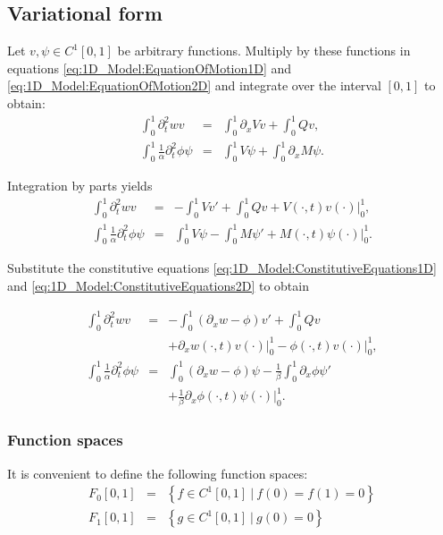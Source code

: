 \documentclass[../../main.tex]{subfiles}
\begin{document}
    \subsection{Variational form}\label{ssec:1D_Model:VariationalForm}
    Let $v, \psi \in C^1[0,1]$ be arbitrary functions. Multiply by these functions in equations \eqref{eq:1D_Model:EquationOfMotion1D} and \eqref{eq:1D_Model:EquationOfMotion2D} and integrate over the interval $[0,1]$ to obtain:
    \begin{eqnarray*}
        \int_{0}^{1} \partial_{t}^{2} w v &=& \int_{0}^{1}\partial_{x}V v + \int_{0}^{1} Q v ,\\
        \int_{0}^{1}\frac{1}{\alpha} \partial_{t}^{2} \phi \psi  &=& \int_{0}^{1}V \psi  + \int_{0}^{1}\partial_{x}M \psi.
    \end{eqnarray*}

    Integration by parts yields
    \begin{eqnarray*}
        \int_{0}^{1} \partial_{t}^{2} w v &=&  - \int_{0}^{1}V v' + \int_{0}^{1} Q v + V(\cdot,t) v(\cdot) |_0^1,\\
        \int_{0}^{1}\frac{1}{\alpha} \partial_{t}^{2} \phi \psi  &=& \int_{0}^{1}V \psi - \int_{0}^{1}M \psi' + M(\cdot,t) \psi(\cdot) |_0^1.
    \end{eqnarray*}

    Substitute the constitutive equations \eqref{eq:1D_Model:ConstitutiveEquations1D} and \eqref{eq:1D_Model:ConstitutiveEquations2D} to obtain

    \begin{eqnarray}
        \int_{0}^{1} \partial_{t}^{2} w v  &=& -\int_{0}^{1}(\partial_x w-\phi) v' + \int_{0}^{1} Q v \nonumber\\
        & & + \left. \partial_x w(\cdot,t) v(\cdot) \right |_0^1 -\left. \phi(\cdot,t) v(\cdot) \right |_0^1, \label{TGT_13}\\
        \int_{0}^{1}\frac{1}{\alpha} \partial_{t}^{2} \phi \psi  &=&  \int_{0}^{1} (\partial_x w - \phi) \psi   - \frac{1}{\beta} \int_{0}^{1}\partial_x \phi \psi' \nonumber \\
        & &+ \frac{1}{\beta}\partial_x \phi(\cdot,t) \psi(\cdot) |_0^1 .\label{TGT_14}
    \end{eqnarray}

    \subsubsection{Function spaces}\label{sssec:1D_Model:FunctionSpace}
    It is convenient to define the following function spaces:
    \begin{eqnarray}
        F_0[0,1] & = & \left\{f \in C^1[0,1] \ | \ f(0) = f(1) = 0 \right\} \label{eq:1D_Model:FunctionSpace1}\\
        F_1[0,1] & = & \left\{g \in C^1[0,1] \ | \ g(0) = 0 \right\} \label{eq:1D_Model:FunctionSpace2}
    \end{eqnarray}
\end{document}
